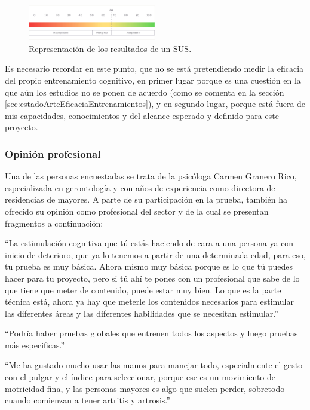 \begin{figure}
	\centering
	\includegraphics[width=0.5\textwidth]{03.EstudioProblema/04.MetodologiaAUsar/00.Figuras/03.sus.png}
	\caption{Representación de los resultados de un SUS. \cite{MU_eval_sus}}
	\label{fig:MU_sus_entrega}
\end{figure}


Es necesario recordar en este punto, que no se está pretendiendo medir la eficacia del propio entrenamiento cognitivo, en primer lugar porque es una cuestión en la que aún los estudios no se ponen de acuerdo (como se comenta en la sección \ref{sec:estadoArteEficaciaEntrenamientos}), y en segundo lugar, porque está fuera de mis capacidades, conocimientos y del alcance esperado y definido para este proyecto.



\subsubsection{Opinión profesional}


Una de las personas encuestadas se trata de la psicóloga Carmen Granero Rico, especializada en gerontología y con años de experiencia como directora de residencias de mayores. A parte de su participación en la prueba, también ha ofrecido su opinión como profesional del sector y de la cual se presentan fragmentos a continuación:


``La estimulación cognitiva que tú estás haciendo de cara a una persona ya con inicio de deterioro, que ya lo tenemos a partir de una determinada edad, para eso, tu prueba es muy básica. Ahora mismo muy básica porque es lo que tú puedes hacer para tu proyecto, pero si tú ahí te pones con un profesional que sabe de lo que tiene que meter de contenido, puede estar muy bien. Lo que es la parte técnica está, ahora ya hay que meterle los contenidos necesarios para estimular las diferentes áreas y las diferentes habilidades que se necesitan estimular.''

``Podría haber pruebas globales que entrenen todos los aspectos y luego pruebas más especificas.''

``Me ha gustado mucho usar las manos para manejar todo, especialmente el gesto con el pulgar y el índice para seleccionar, porque ese es un movimiento de motricidad fina, y las personas mayores es algo que suelen perder, sobretodo cuando comienzan a tener artritis y artrosis.''

